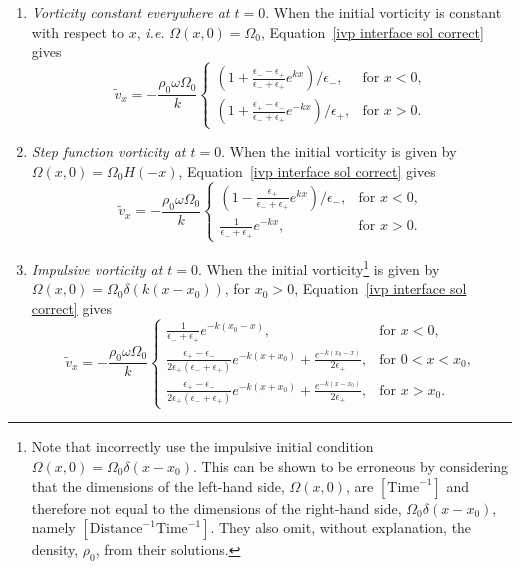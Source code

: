 \documentclass[12pt]{../style-files/ociamthesis}
\begin{document}
\begin{enumerate}
	\item \label{IC1} \textit{Vorticity constant everywhere at $t = 0$}. When the initial vorticity is constant with respect to $x$, \textit{i.e.} $\Omega(x,0) = \Omega_0$, Equation~\eqref{ivp interface sol correct} gives
	\begin{equation}
	\tilde{v}_x = -\frac{\rho_0\omega\Omega_0}{k}
	\begin{cases}
	\left(1 + \frac{\epsilon_- - \epsilon_+}{\epsilon_- + \epsilon_+}e^{kx}\right)/\epsilon_-, & \text{for } x<0, \\
	\left(1 + \frac{\epsilon_+ - \epsilon_-}{\epsilon_- + \epsilon_+}e^{-kx}\right)/\epsilon_+, & \text{for } x>0.
	\end{cases}
	\end{equation}
	\item \label{IC2} \textit{Step function vorticity at $t = 0$}. When the initial vorticity is given by $\Omega(x,0) = \Omega_0H(-x)$, Equation~\eqref{ivp interface sol correct} gives
	\begin{equation}
	\tilde{v}_x = -\frac{\rho_0\omega\Omega_0}{k}
	\begin{cases}
	\left(1 - \frac{\epsilon_+}{\epsilon_- + \epsilon_+}e^{kx}\right)/\epsilon_-, & \text{for } x<0, \\
	\frac{1}{\epsilon_- + \epsilon_+}e^{-kx}, & \text{for } x>0.
	\end{cases}
	\end{equation}
	\item  \label{IC3} \textit{Impulsive vorticity at $t = 0$}. When the initial vorticity\footnote{Note that \cite{rae_etal81} incorrectly use the impulsive initial condition $\Omega(x,0) = \Omega_0\delta(x-x_0)$. This can be shown to be erroneous by considering that the dimensions of the left-hand side, $\Omega(x,0)$, are $[\mathrm{Time}^{-1}]$ and therefore not equal to the dimensions of the right-hand side, $\Omega_0\delta(x-x_0)$, namely $[\mathrm{Distance}^{-1}\mathrm{Time}^{-1}]$. They also omit, without explanation, the density, $\rho_0$, from their solutions.} is given by {$\Omega(x,0) = \Omega_0\delta(k(x-x_0))$}, for $x_0>0$, Equation~\eqref{ivp interface sol correct} gives
	\begin{equation}
	\tilde{v}_x = -\frac{\rho_0\omega\Omega_0}{k}
	\begin{cases}
	\frac{1}{\epsilon_- + \epsilon_+}e^{-k(x_0 - x)}, & \text{for } x < 0, \\
	\frac{\epsilon_+ - \epsilon_-}{2\epsilon_+(\epsilon_- + \epsilon_+)}e^{-k(x + x_0)} + \frac{e^{-k(x_0 - x)}}{2\epsilon_+}, & \text{for } 0<x<x_0, \\
	\frac{\epsilon_+ - \epsilon_-}{2\epsilon_+(\epsilon_- + \epsilon_+)}e^{-k(x + x_0)} + \frac{e^{-k(x - x_0)}}{2\epsilon_+}, & \text{for } x>x_0.
	\end{cases}
	\end{equation}
\end{enumerate}
\end{document}
